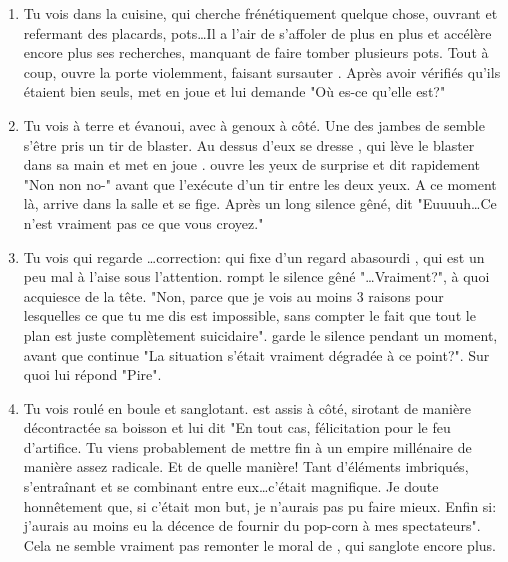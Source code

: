 {	\begin{enumerate}
		\item Tu vois \nmPlayerII dans la cuisine, qui cherche frénétiquement quelque chose, ouvrant et refermant des placards, pots\dots Il a l'air de s'affoler de plus en plus et accélère encore plus ses recherches, manquant de faire tomber plusieurs pots. Tout à coup, \nmPlayerVIII ouvre la porte violemment, faisant sursauter \nmPlayerII. Après avoir vérifiés qu'ils étaient bien seuls, \nmPlayerVIII met en joue \nmPlayerII et lui demande "Où es-ce qu'elle est?"
		
		\item Tu vois \nmPlayerII à terre et évanoui, avec \nmPlayerI à genoux à côté. Une des jambes de \nmPlayerI semble s'être pris un tir de blaster. Au dessus d'eux se dresse \nmPlayerXI, qui lève le blaster dans sa main et met en joue \nmPlayerI. \nmPlayerI ouvre les yeux de surprise et dit rapidement "Non non no-" avant que \nmPlayerXI l'exécute d'un tir entre les deux yeux. A ce moment là, \nmPlayerVII arrive dans la salle et \nmPlayerXI se fige. Après un long silence gêné, \nmPlayerVII dit "Euuuuh\dots Ce n'est vraiment pas ce que vous croyez."
		
		\item Tu vois \nmPlayerVII qui regarde \nmPlayerV\dots correction: qui fixe d'un regard abasourdi \nmPlayerV, qui est un peu mal à l'aise sous l'attention. \nmPlayerVII rompt le silence gêné "\dots Vraiment?", à quoi \nmPlayerV acquiesce de la tête. "Non, parce que je vois au moins 3 raisons pour lesquelles ce que tu me dis est impossible, sans compter le fait que tout le plan est juste complètement suicidaire". \nmPlayerV garde le silence pendant un moment, avant que \nmPlayerVII continue "La situation s'était vraiment dégradée à ce point?". Sur quoi \nmPlayerV lui répond "Pire".
		
		\item Tu vois \nmPlayerXI roulé en boule et sanglotant. \nmPlayerIV est assis à côté, sirotant de manière décontractée sa boisson et lui dit "En tout cas, félicitation pour le feu d'artifice. Tu viens probablement de mettre fin à un empire millénaire de manière assez radicale. Et de quelle manière! Tant d'éléments imbriqués, s'entraînant et se combinant entre eux\dots c'était magnifique. Je doute honnêtement que, si c'était mon but, je n'aurais pas pu faire mieux. Enfin si: j'aurais au moins eu la décence de fournir du pop-corn à mes spectateurs". Cela ne semble vraiment pas remonter le moral de \nmPlayerXI, qui sanglote encore plus.
		

\end{enumerate}}

